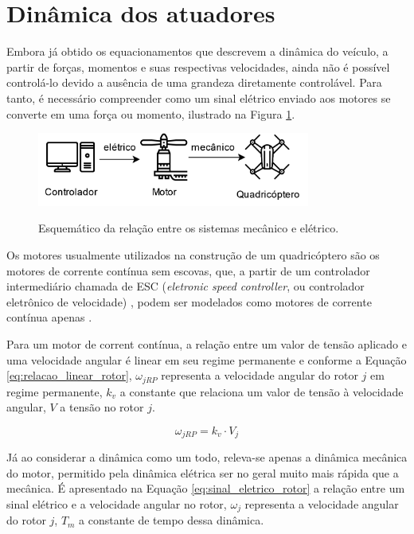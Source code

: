 \documentclass[main.tex]{subfiles}
\begin{document}
\section{Dinâmica dos atuadores}\label{sec:dinamica_atuadores}

Embora já obtido os equacionamentos que descrevem a dinâmica do veículo, a partir de forças, momentos e suas respectivas velocidades, ainda não é possível controlá-lo devido a ausência de uma grandeza diretamente controlável. Para tanto, é necessário compreender como um sinal elétrico enviado aos motores se converte em uma força ou momento, ilustrado na Figura \ref{fig:sistemas_mecanico_eletrico}. 

\begin{figure}[!h]
	\centering
	\caption{Esquemático da relação entre os sistemas mecânico e elétrico.}
	\includegraphics[width=0.8\textwidth]{capitulos/modelagem/imgs/sistema.png}
	\label{fig:sistemas_mecanico_eletrico}
\end{figure}

Os motores usualmente utilizados na construção de um quadricóptero são os motores de corrente contínua sem escovas, que, a partir de um controlador intermediário chamada de ESC (\textit{eletronic speed controller}, ou controlador eletrônico de velocidade) \cite{esc_ref}, podem ser modelados como motores de corrente contínua apenas \cite{popoola2015modelling}. 

Para um motor de corrent contínua, a relação entre um valor de tensão aplicado e uma velocidade angular é linear em seu regime permanente e conforme a Equação \ref{eq:relacao_linear_rotor}, $\omega_{jRP}$ representa a velocidade angular do rotor $j$ em regime permanente, $k_v$ a constante que relaciona um valor de tensão à velocidade angular, $V$ a tensão no rotor $j$.

\begin{equation}\label{eq:relacao_linear_rotor}
	\omega_{jRP} = k_v \cdot V_j
\end{equation}

Já ao considerar a dinâmica como um todo, releva-se apenas a dinâmica mecânica do motor, permitido pela dinâmica elétrica ser no geral muito mais rápida que a mecânica. É apresentado na Equação \ref{eq:sinal_eletrico_rotor} a relação entre um sinal elétrico e a velocidade angular no rotor, $\omega_j$ representa a velocidade angular do rotor $j$, $T_m$ a constante de tempo dessa dinâmica.
\end{document}
